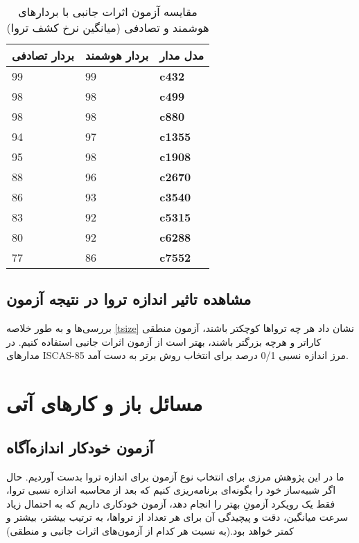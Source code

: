 \begin{table}[t]
	
	\begin{center}
		\begin{tabular}{| p{4cm} | p{4cm} |p{2cm}|}
			\hline
			\textbf{ بردار تصادفی} & \textbf{ بردار هوشمند} & \textbf{مدل مدار} \\ \hline \hline
			99 & 99 &\textbf{c432} \\ \hline
			98 & 98 &\textbf{c499} \\ \hline
			98 & 98 &\textbf{c880} \\ \hline
			94 & 97 &\textbf{c1355} \\ \hline
			95 & 98 &\textbf{c1908} \\ \hline
			88 & 96 &\textbf{c2670} \\ \hline
			86 & 93 &\textbf{c3540} \\ \hline
			83 & 92 &\textbf{c5315} \\ \hline
			80 & 92 &\textbf{c6288} \\ \hline
			77 & 86 &\textbf{c7552} \\ \hline 
		\end{tabular}
		\caption{
			مقایسه آزمون اثرات جانبی با بردارهای هوشمند و تصادفی (میانگین نرخ کشف تروا)}
		\label{tsideivectors}
	\end{center}
\end{table}


\subsection{مشاهده تاثیر اندازه تروا در نتیجه آزمون}
بررسی‌ها و به طور خلاصه \ref{tsize} نشان داد هر چه تروا‌ها کوچکتر باشند، آزمون منطقی کارا‌تر و هرچه بزرگتر باشند، بهتر است از آزمون اثرات جانبی استفاده کنیم. در مدارهای ISCAS-85 مرز اندازه نسبی 0/1 درصد برای انتخاب روش برتر به دست آمد.

\section{مسائل باز و کارهای آتی}

\subsection{آزمون خودکار اندازه‌آگاه}
ما در این پژوهش مرزی برای انتخاب نوع آزمون برای اندازه تروا بدست آوردیم. حال اگر شبیه‌ساز خود را بگونه‌ای برنامه‌ریزی کنیم که بعد از محاسبه اندازه نسبی تروا، فقط یک رویکرد آزمونِ بهتر را انجام دهد، آزمون خودکاری داریم که به احتمال زیاد سرعت میانگین، دقت و پیچیدگی آن برای هر تعداد از تروا‌ها، به ترتیب بیشتر، بیشتر و کمتر خواهد بود.(به نسبت هر کدام از آزمون‌های اثرات جانبی و منطقی)
